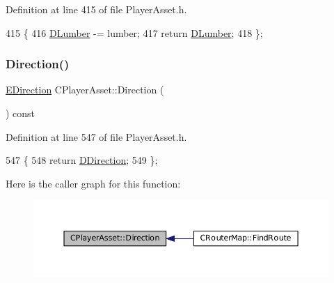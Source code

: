 Definition at line 415 of file Player\+Asset.\+h.


\begin{DoxyCode}
415                                        \{
416             \hyperlink{classCPlayerAsset_af726ea7df9596f02cdb1428d61186349}{DLumber} -= lumber;
417             \textcolor{keywordflow}{return} \hyperlink{classCPlayerAsset_af726ea7df9596f02cdb1428d61186349}{DLumber};
418         \};
\end{DoxyCode}
\hypertarget{classCPlayerAsset_add74a452e9a030ae0d04d4281d964935}{}\label{classCPlayerAsset_add74a452e9a030ae0d04d4281d964935} 
\subsubsection{\texorpdfstring{Direction()}{Direction()}\hspace{0.1cm}{\footnotesize\ttfamily [1/2]}}
{\footnotesize\ttfamily \hyperlink{GameDataTypes_8h_acb2b033915f6659a71a38b5aa6e4eb42}{E\+Direction} C\+Player\+Asset\+::\+Direction (\begin{DoxyParamCaption}{ }\end{DoxyParamCaption}) const\hspace{0.3cm}{\ttfamily [inline]}}



Definition at line 547 of file Player\+Asset.\+h.


\begin{DoxyCode}
547                                     \{
548             \textcolor{keywordflow}{return} \hyperlink{classCPlayerAsset_a2f07e280268d0402220c583d1029d683}{DDirection};
549         \};
\end{DoxyCode}
Here is the caller graph for this function\+:\nopagebreak
\begin{figure}[H]
\begin{center}
\leavevmode
\includegraphics[width=350pt]{classCPlayerAsset_add74a452e9a030ae0d04d4281d964935_icgraph}
\end{center}
\end{figure}
\hypertarget{classCPlayerAsset_abda0d14d43b52315a40defa0a6a2440f}{}\label{classCPlayerAsset_abda0d14d43b52315a40defa0a6a2440f} 
